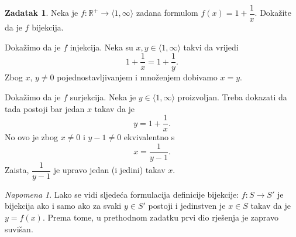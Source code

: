 \documentclass{book}
\renewenvironment{proof}{%
    \vspace{-\parskip}\begin{oldproof}%
    }{%
    \end{oldproof}%
}
\theoremstyle{definition}
\theoremstyle{definition}
\newtheorem{exercise}{Zadatak}
\theoremstyle{remark}
\newtheorem{remark}{Napomena}
\begin{document}
\begin{exercise}
Neka je $f : \mathbb{R}^+\to \langle 1, \infty\rangle $ zadana formulom $f(x)=1+\dfrac{1}{x}$. Dokažite da je $f$ bijekcija.
\end{exercise}
\begin{proof}[Rješenje]
Dokažimo da je $f$ injekcija. Neka su $x, y\in \langle 1, \infty\rangle$ takvi da vrijedi $$1+\dfrac{1}{x}=1+\dfrac{1}{y}.$$ Zbog $x$, $y\neq 0$ pojednostavljivanjem i množenjem dobivamo $x=y$. 

Dokažimo da je $f$ surjekcija. Neka je $y\in \langle 1, \infty\rangle$ proizvoljan. Treba dokazati da tada postoji bar jedan $x$ takav da je $$y=1+\dfrac{1}{x}.$$ No ovo je zbog $x\neq 0$ i $y-1\neq 0$ ekvivalentno s $$x=\dfrac{1}{y-1}.$$ Zaista, $\dfrac{1}{y-1}$ je upravo jedan (i jedini) takav $x$.
\end{proof}
\begin{remark}
Lako se vidi sljedeća formulacija definicije bijekcije: $f : S\to S'$ je bijekcija ako i samo ako za svaki $y\in S'$ postoji i jedinstven je $x\in S$ takav da je $y=f(x)$. Prema tome, u prethodnom zadatku prvi dio rješenja je zapravo suvišan.
\end{remark}
\end{document}
